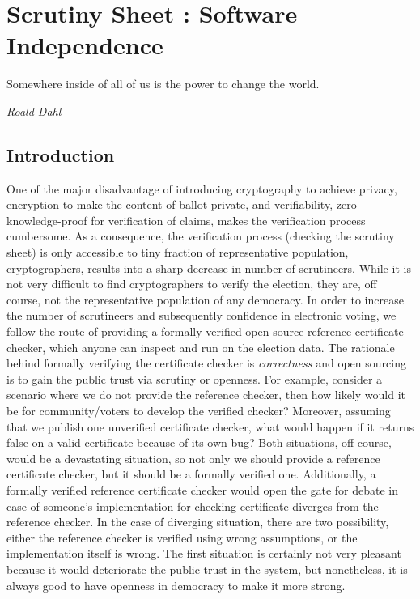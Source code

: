 \chapter{Scrutiny Sheet : Software Independence}
\label{cha:software_independence}
\setlength{\parindent}{2em}

\epigraph{Somewhere inside of all of us is the power to change the world.} 
{\textit{Roald Dahl }}

\section{Introduction}


One of the major disadvantage of introducing cryptography 
to achieve privacy, encryption to make the 
content of ballot private,  and verifiability, zero-knowledge-proof for verification of claims, makes the verification 
process cumbersome. As a consequence, the verification process (checking the scrutiny sheet) is only accessible 
to tiny fraction of representative population, cryptographers, results into a sharp decrease in number of scrutineers. 
While it is not very difficult to find cryptographers to verify the election, 
they are, off course, not the representative population of any democracy. 
In order to increase the number of scrutineers and subsequently confidence in electronic voting, we follow the 
route of providing a formally verified open-source 
reference certificate checker, which anyone can inspect and run on the election data. 
  The rationale behind formally verifying the certificate checker is \emph{correctness}
  and open sourcing is to gain the public trust  via scrutiny or openness.  
  For example, consider a scenario where we do not provide the reference checker,
  then how 
  likely would it be for community/voters to develop the 
  verified checker? Moreover, assuming that we publish one unverified certificate checker,
  what would happen if it returns false on a valid certificate because of its own bug? 
  Both situations, off course, would be a devastating situation, so not only we 
  should provide a reference certificate checker, but it should be a formally verified one. 
  Additionally, a formally verified reference certificate checker would open the gate for
  debate in case of someone's implementation for checking certificate diverges from the reference checker.
In the case of diverging situation, there are two possibility, either the reference checker is verified 
using wrong assumptions,  or the implementation itself is wrong.  The first situation is certainly 
not very pleasant because it would deteriorate the public trust in the system, but nonetheless, it is always
good to  have openness in democracy to make it more strong. 
  
